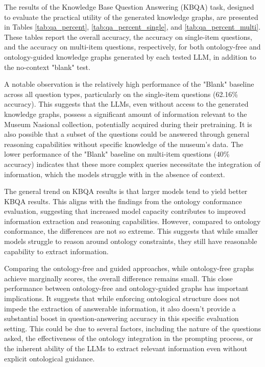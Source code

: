\documentclass[a4, conference]{IEEEtran}
\begin{document}
The results of the Knowledge Base Question Answering (KBQA) task, designed to evaluate the practical utility of the generated knowledge graphs, are presented in Tables \ref{tab:qa_percent}, \ref{tab:qa_percent_single}, and \ref{tab:qa_percent_multi}. These tables report the overall accuracy, the accuracy on single-item questions, and the accuracy on multi-item questions, respectively, for both ontology-free and ontology-guided knowledge graphs generated by each tested LLM, in addition to the no-context "blank" test.

A notable observation is the relatively high performance of the "Blank" baseline across all question types, particularly on the single-item questions (62.16\% accuracy). This suggests that the LLMs, even without access to the generated knowledge graphs, possess a significant amount of information relevant to the Museum Nasional collection, potentially acquired during their pretraining. It is also possible that a subset of the questions could be answered through general reasoning capabilities without specific knowledge of the museum's data. The lower performance of the "Blank" baseline on multi-item questions (40\% accuracy) indicates that these more complex queries necessitate the integration of information, which the models struggle with in the absence of context.

The general trend on KBQA results is that larger models tend to yield better KBQA results. This aligns with the findings from the ontology conformance evaluation, suggesting that increased model capacity contributes to improved information extraction and reasoning capabilities. However, compared to ontology conformance, the differences are not so extreme. This suggests that while smaller models struggle to reason around ontology constraints, they still have reasonable capability to extract information.

Comparing the ontology-free and guided approaches, while ontology-free graphs achieve marginally scores, the overall difference remains small. This close performance between ontology-free and ontology-guided graphs has important implications. It suggests that while enforcing ontological structure does not impede the extraction of answerable information, it also doesn't provide a substantial boost in question-answering accuracy in this specific evaluation setting. This could be due to several factors, including the nature of the questions asked, the effectiveness of the ontology integration in the prompting process, or the inherent ability of the LLMs to extract relevant information even without explicit ontological guidance.
\end{document}
